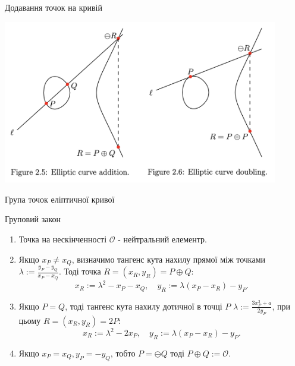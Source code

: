 \documentclass[10pt]{beamer}
\begin{document}
\begin{darkframes}
\begin{frame}{Додавання точок на кривій}
\begin{center}
    \includegraphics[width=0.9\textwidth]{resources/addition.png}
    \end{center}
\end{frame}

\begin{frame}{Група точок еліптичної кривої}
        \begin{block}{Груповий закон}
            \begin{enumerate}
                \item Точка на нескінченності $\mathcal{O}$ - нейтральний елементр. 
                \item Якщо $x_P\neq x_Q$, визначимо тангенс кута нахилу прямої між точками $\lambda := \frac{y_P-y_Q}{x_P-x_Q}$. Тоді точка $R=(x_R, y_R) = P \oplus Q$:
                \begin{equation*}
                    x_R := \lambda^2 - x_P - x_Q, \quad y_R := \lambda(x_P-x_R)-y_P.
                \end{equation*}
                \item Якщо $P=Q$, тоді тангенс кута нахилу дотичної в точці $P$ $\lambda := \frac{3x_P^2+a}{2y_P}$, при цьому $R=(x_R, y_R)=2P$:
                \begin{equation*}
                    x_R := \lambda^2 - 2x_P, \quad y_R := \lambda(x_P-x_R)-y_P.
                \end{equation*}
                \item Якщо $x_P = x_Q, y_P = -y_Q$, тобто $P=\ominus Q$ тоді $P \oplus Q := \mathcal{O}$.
            \end{enumerate}
        \end{block}
    \end{frame}
  \end{darkframes}
\end{document}
